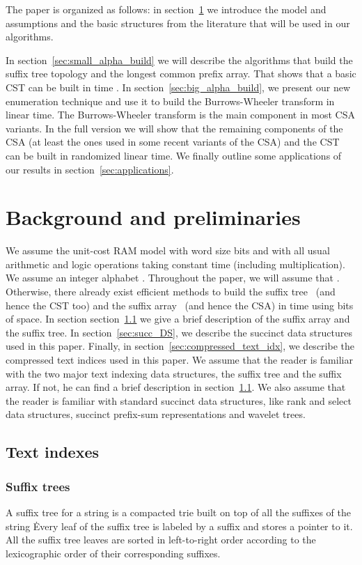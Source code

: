 \documentclass[a4paper]{article}
\begin{document}
The paper is organized as follows: in section~\ref{sec:back_prel}
we introduce the model and assumptions
and the basic structures from the literature 
that will be used in our algorithms. 

In section~\ref{sec:small_alpha_build} we will describe the algorithms 
that build the suffix tree topology and the longest common prefix array. 
That shows that a basic \textsc{CST} can be built in time . 
In section~\ref{sec:big_alpha_build}, we present our new enumeration technique
and use it to build the Burrows-Wheeler transform in linear time. The Burrows-Wheeler 
transform is the main component in most \textsc{CSA} variants. In the full 
version we will show that the remaining components of the \textsc{CSA}
(at least the ones used in some recent variants of the CSA) and the \textsc{CST}
can be built in randomized linear time. 
We finally outline some applications of our results in section~\ref{sec:applications}. 


\section{Background and preliminaries}
\label{sec:back_prel}
We assume the unit-cost RAM model with word size  bits and with all usual arithmetic and logic
operations taking constant time (including multiplication). 
We assume an integer alphabet . Throughout the paper, we will assume that . Otherwise, there already exist efficient methods to build the suffix tree~\cite{Fa97} (and hence the \textsc{CST} too) and the suffix array~\cite{KA03,KSPP05,KSB06} (and hence the \textsc{CSA}) in  time using  bits of space. 
In section section~\ref{sec:text_indexes} we give a brief description of the suffix array and the suffix tree.
In section~\ref{sec:succ_DS}, we describe the succinct data structures used in this paper. Finally, in section~\ref{sec:compressed_text_idx}, we describe the compressed text indices used in this paper. 
We assume that the reader is familiar with the two major text indexing data structures, the suffix tree and the suffix array. If not, he can find a brief description in section~\ref{sec:text_indexes}. We also assume that the reader is familiar with standard succinct data structures, like rank and select data structures, succinct prefix-sum representations and wavelet trees. 
\subsection{Text indexes}
\label{sec:text_indexes}
\subsubsection{Suffix trees}
A suffix tree for a string  is a compacted trie built on top of all the suffixes of the string \. 
Every leaf of the suffix tree is labeled by a suffix and stores a pointer to it. All the suffix tree leaves are sorted in 
left-to-right order according to the lexicographic order of their corresponding suffixes. 
\end{document}
